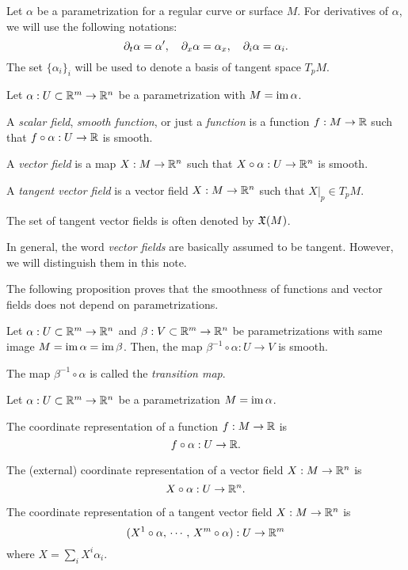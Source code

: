 \documentclass{../note}
\def\a{\alpha}
\begin{document}
\begin{notn*}
Let $\a$ be a parametrization for a regular curve or surface $M$.
For derivatives of $\a$, we will use the following notations:
\[\pd_t\a=\a',\quad\pd_x\a=\a_x,\quad\pd_i\a=\a_i.\]
The set $\{\a_i\}_i$ will be used to denote a basis of tangent space $T_pM$.
\end{notn*}






\begin{defn}
Let $\a:U\subset\R^m\to\R^n$ be a parametrization with $M=\im\a$.
\begin{parts}
\item A \emph{scalar field}, \emph{smooth function}, or just a \emph{function} is a function $f:M\to\mathbb{R}$ such that $f\circ\a:U\to\R$ is smooth.
\item A \emph{vector field} is a map $X:M\to\mathbb{R}^n$ such that $X\circ\a:U\to\R^n$ is smooth.
\item A \emph{tangent vector field} is a vector field $X:M\to\mathbb{R}^n$ such that $X|_p\in T_pM$.
\end{parts}
The set of tangent vector fields is often denoted by $\mathfrak{X}(M)$.
\end{defn}
\begin{rmk}
In general, the word \emph{vector fields} are basically assumed to be tangent.
However, we will distinguish them in this note.
\end{rmk}

The following proposition proves that the smoothness of functions and vector fields does not depend on parametrizations.

\begin{prop}
Let $\a:U\subset\R^m\to\R^n$ and $\beta:V\subset\mathbb{R}^m\to\mathbb{R}^n$ be parametrizations with same image $M=\im\a=\im\beta$.
Then, the map $\beta^{-1}\circ\a:U\to V$ is smooth.
\end{prop}
\begin{pf}
\end{pf}
\begin{rmk}
The map $\beta^{-1}\circ\a$ is called the \emph{transition map}.
\end{rmk}

\begin{defn}
Let $\a:U\subset\R^m\to\R^n$ be a parametrization $M=\im\a$.
\begin{parts}
\item The coordinate representation of a function $f:M\to\mathbb{R}$ is
\[f\circ\a:U\to\R.\]
\item The (external) coordinate representation of a vector field $X:M\to\mathbb{R}^n$ is
\[X\circ\a:U\to\R^n.\]
\item The coordinate representation of a tangent vector field $X:M\to\mathbb{R}^n$ is
\[(X^1\circ\a,\,\cdots,\,X^m\circ\a):U\to\R^m\]
where $X=\sum_iX^i\a_i$.
\end{parts}
\end{defn}
\end{document}
